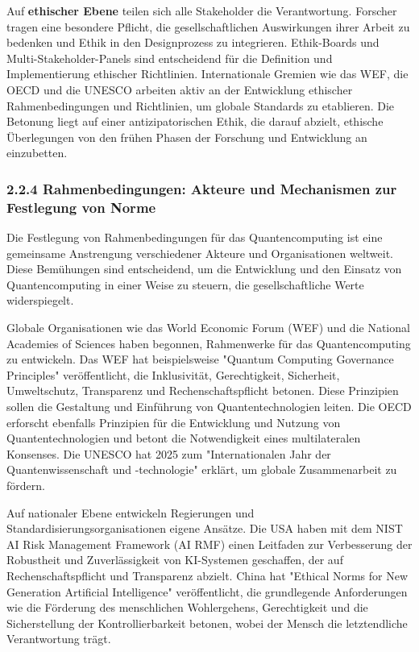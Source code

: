 Auf \textbf{ethischer Ebene} teilen sich alle Stakeholder die Verantwortung. Forscher tragen eine besondere Pflicht, die gesellschaftlichen Auswirkungen ihrer Arbeit zu bedenken und Ethik in den Designprozess zu integrieren. Ethik-Boards und Multi-Stakeholder-Panels sind entscheidend für die Definition und Implementierung ethischer Richtlinien. Internationale Gremien wie das WEF, die OECD und die UNESCO arbeiten aktiv an der Entwicklung ethischer Rahmenbedingungen und Richtlinien, um globale Standards zu etablieren. Die Betonung liegt auf einer antizipatorischen Ethik, die darauf abzielt, ethische Überlegungen von den frühen Phasen der Forschung und Entwicklung an einzubetten.

\subsubsection{2.2.4 Rahmenbedingungen: Akteure und Mechanismen zur Festlegung von Norme}
Die Festlegung von Rahmenbedingungen für das Quantencomputing ist eine gemeinsame Anstrengung verschiedener Akteure und Organisationen weltweit. Diese Bemühungen sind entscheidend, um die Entwicklung und den Einsatz von Quantencomputing in einer Weise zu steuern, die gesellschaftliche Werte widerspiegelt.

Globale Organisationen wie das World Economic Forum (WEF) und die National Academies of Sciences haben begonnen, Rahmenwerke für das Quantencomputing zu entwickeln. Das WEF hat beispielsweise "Quantum Computing Governance Principles" veröffentlicht, die Inklusivität, Gerechtigkeit, Sicherheit, Umweltschutz, Transparenz und Rechenschaftspflicht betonen. Diese Prinzipien sollen die Gestaltung und Einführung von Quantentechnologien leiten. Die OECD erforscht ebenfalls Prinzipien für die Entwicklung und Nutzung von Quantentechnologien und betont die Notwendigkeit eines multilateralen Konsenses. Die UNESCO hat 2025 zum "Internationalen Jahr der Quantenwissenschaft und -technologie" erklärt, um globale Zusammenarbeit zu fördern.

Auf nationaler Ebene entwickeln Regierungen und Standardisierungsorganisationen eigene Ansätze. Die USA haben mit dem NIST AI Risk Management Framework (AI RMF) einen Leitfaden zur Verbesserung der Robustheit und Zuverlässigkeit von KI-Systemen geschaffen, der auf Rechenschaftspflicht und Transparenz abzielt. China hat "Ethical Norms for New Generation Artificial Intelligence" veröffentlicht, die grundlegende Anforderungen wie die Förderung des menschlichen Wohlergehens, Gerechtigkeit und die Sicherstellung der Kontrollierbarkeit betonen, wobei der Mensch die letztendliche Verantwortung trägt.

